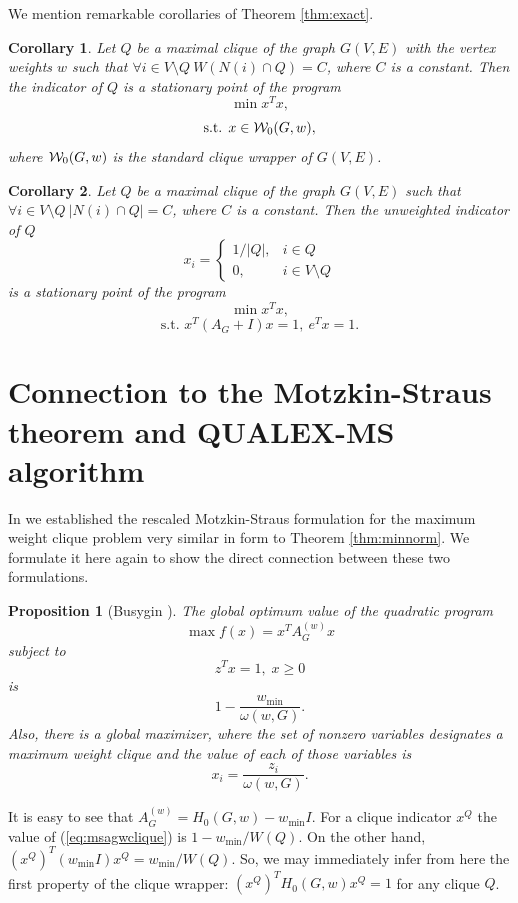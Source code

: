 \documentclass[11pt]{article}
\newtheorem{cor}{Corollary}
\newtheorem{prop}{Proposition}
\begin{document}
We mention remarkable corollaries of Theorem \ref{thm:exact}.

\begin{cor}
\label{cor:exact2}
Let $Q$ be a maximal clique of the graph $G(V,E)$ with the vertex weights $w$
such that $\forall i \in V \setminus Q \ W(N(i) \cap Q) = C$, where $C$ is
a constant. Then the indicator of $Q$ is a stationary point of the program
\begin{equation}
\label{eq:minnormrelax2}
\min x^T x,
\end{equation}
\[ \mbox{s.t. } x \in {\cal W}_0(G,w), \]
where ${\cal W}_0(G,w)$ is the standard clique wrapper of $G(V,E)$.
\end{cor}

\begin{cor}
\label{cor:exact3}
Let $Q$ be a maximal clique of the graph $G(V,E)$ such that
$\forall i \in V \setminus Q \ |N(i) \cap Q| = C$, where $C$ is a constant.
Then the unweighted indicator of $Q$
\[ x_i = \left\{ \begin{array}{ll}
  1/|Q|, & i \in Q \\
  0, & i \in V \setminus Q
\end{array} \right. \]
is a stationary point of the program
\begin{equation}
\label{eq:minnormrelax3}
\min x^T x,
\end{equation}
\[ \mbox{s.t. } x^T (A_G+I) x = 1, \ e^T x = 1. \]
\end{cor}

\section{Connection to the Motzkin-Straus theorem and QUALEX-MS algorithm}

In \cite{B02} we established the rescaled Motzkin-Straus formulation for
the maximum weight clique problem very similar in form to Theorem
\ref{thm:minnorm}. We formulate it here again to show the direct connection
between these two formulations.
\begin{prop}[Busygin \cite{B02}]
\label{fact:msagw}
The global optimum value of the quadratic program
\begin{equation}
\label{eq:msagwclique}
\max f(x) = x^T A^{(w)}_G x
\end{equation}
subject to
\begin{equation}
\label{eq:msagwconstr}
z^T x = 1, \; x \geq 0
\end{equation}
is
\[ 1-\frac{w_{\min}}{\omega(w,G)}. \]
Also, there is a global maximizer, where the set of nonzero variables
designates a maximum weight clique and the value of each of those
variables is
\begin{equation}
\label{eq:msagwx}
x_i = \frac{z_i}{\omega(w,G)}.
\end{equation}
\end{prop}
It is easy to see that $A^{(w)}_G=H_0(G,w)-w_{\min}I$. For a clique indicator
$x^Q$ the value of (\ref{eq:msagwclique}) is $1-w_{\min}/W(Q)$. On the other
hand, $(x^Q)^T (w_{\min}I) x^Q = w_{\min}/W(Q)$. So, we may immediately infer
from here the first property of the clique wrapper:
$(x^Q)^T H_0(G,w) x^Q = 1$ for any clique $Q$.
\end{document}
